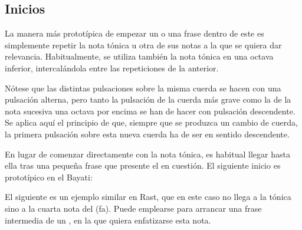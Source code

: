 \subsection{Inicios}

La manera más prototípica de empezar un \taqsim o una frase dentro de este es simplemente repetir la nota tónica u otra de sus notas a la que se quiera dar relevancia. Habitualmente, se utiliza también la nota tónica en una octava inferior, intercalándola entre las repeticiones de la anterior.


\begin{center}
\end{center}


Nótese que las distintas pulsaciones sobre la misma cuerda se hacen con una pulsación alterna, pero tanto la pulsación de la cuerda más grave como la de la nota sucesiva una octava por encima se han de hacer con pulsación descendente. Se aplica aquí el principio de que, siempre que se produzca un cambio de cuerda, la primera pulsación sobre esta nueva cuerda ha de ser en sentido descendente.

En lugar de comenzar directamente con la nota tónica, es habitual llegar hasta ella tras una pequeña frase que presente el \yins en cuestión. El siguiente inicio es prototípico en el \maqam Bayati:


\begin{center}
\end{center}


El siguiente es un ejemplo similar en \maqam Rast, que en este caso no llega a la tónica sino a la cuarta nota del \maqam (fa). Puede emplearse para arrancar una frase intermedia de un \taqsimb, en la que quiera enfatizarse esta nota.


